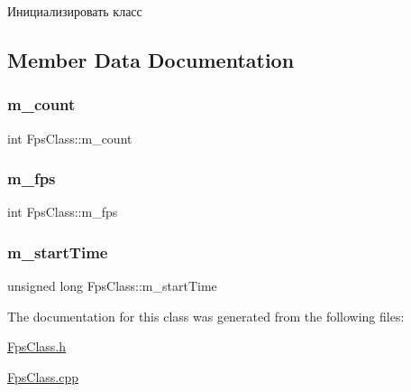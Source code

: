 Инициализировать класс 



\subsection{Member Data Documentation}
\mbox{\label{class_fps_class_ad567650f12c7fffef65550ee2d59b5df}} 
\subsubsection{\texorpdfstring{m\+\_\+count}{m\_count}}
{\footnotesize\ttfamily int Fps\+Class\+::m\+\_\+count\hspace{0.3cm}{\ttfamily [private]}}

\mbox{\label{class_fps_class_aefa78e89d06e60bd61de47885e942270}} 
\subsubsection{\texorpdfstring{m\+\_\+fps}{m\_fps}}
{\footnotesize\ttfamily int Fps\+Class\+::m\+\_\+fps\hspace{0.3cm}{\ttfamily [private]}}

\mbox{\label{class_fps_class_a3a5d1c366d4bb51d1867dd41cee38fb4}} 
\subsubsection{\texorpdfstring{m\+\_\+start\+Time}{m\_startTime}}
{\footnotesize\ttfamily unsigned long Fps\+Class\+::m\+\_\+start\+Time\hspace{0.3cm}{\ttfamily [private]}}



The documentation for this class was generated from the following files\+:\begin{DoxyCompactItemize}
\item 
\hyperlink{_fps_class_8h}{Fps\+Class.\+h}\item 
\hyperlink{_fps_class_8cpp}{Fps\+Class.\+cpp}\end{DoxyCompactItemize}
